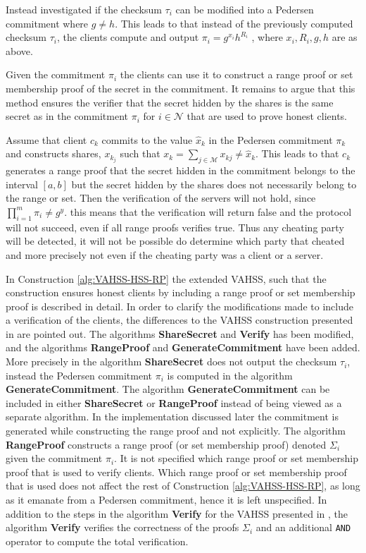 Instead investigated if the checksum $\tau_i$ can be modified into a Pedersen commitment where $g\neq h$. This leads to that instead of the previously computed checksum $\tau_i$,  the clients compute and output $\pi_i=g^{x_i}h^{R_i}$ , where $x_i,R_i,g,h$ are as above.

Given the commitment $\pi_i$ the clients can use it to construct a range proof or set membership proof of the secret in the commitment.  It remains to argue that this method ensures the verifier that the secret hidden by the shares is the same secret as in the commitment $\pi_i$ for $i\in\mathcal{N}$ that are used to prove honest clients.

Assume that client $c_k$ commits to the value $\hat{x}_k$ in the Pedersen commitment $\pi_k$ and constructs shares, $x_k_j$ such that $x_k = \sum_{j\in\mathcal{M}}x_{kj} \neq \hat{x}_k$. This leads to that $c_k$ generates a range proof that the secret hidden in the commitment belongs to the interval $[a,b]$ but the secret hidden by the shares does not necessarily belong to the range or set. Then the verification of the servers will not hold, since  $\prod_{i=1}^m \pi_i \neq g^y$. this means that the verification will return false and the protocol will not succeed, even if all  range proofs verifies true. Thus any cheating party will be detected, it will not be possible do determine which party that cheated and more precisely not even if the cheating party was a client or a server. 

In Construction \ref{alg:VAHSS-HSS-RP} the extended VAHSS, such that the construction ensures honest clients by including a range proof or set membership proof is described in detail. In order to clarify the modifications made to include a verification of the clients, the differences to the VAHSS construction presented in \cite{SumItUp} are pointed out. The algorithms \textbf{ShareSecret} and \textbf{Verify} has been modified,  and the algorithms \textbf{RangeProof} and \textbf{GenerateCommitment} have been added. More precisely in the algorithm \textbf{ShareSecret} does not output the checksum $\tau_i$, instead the Pedersen commitment $\pi_i$ is computed in the algorithm \textbf{GenerateCommitment}. The algorithm  \textbf{GenerateCommitment} can be included in either \textbf{ShareSecret}  or \textbf{RangeProof} instead of being viewed as a separate algorithm. In the implementation discussed later the commitment is generated while constructing the range proof and not explicitly. The algorithm \textbf{RangeProof} constructs a range proof (or set membership proof) denoted $\Sigma_i$ given the commitment $\pi_i$. It is not specified which range proof or set membership proof that is used to verify clients.  Which range proof or set membership proof that is used does not affect the rest of Construction \ref{alg:VAHSS-HSS-RP}, as long as it emanate from a Pedersen commitment, hence it is left unspecified. In addition to the steps in the algorithm \textbf{Verify} for the VAHSS presented in \cite{SumItUp}, the algorithm \textbf{Verify} verifies the correctness of the proofs $\Sigma_i$ and an additional \texttt{AND} operator to compute the total verification.  


